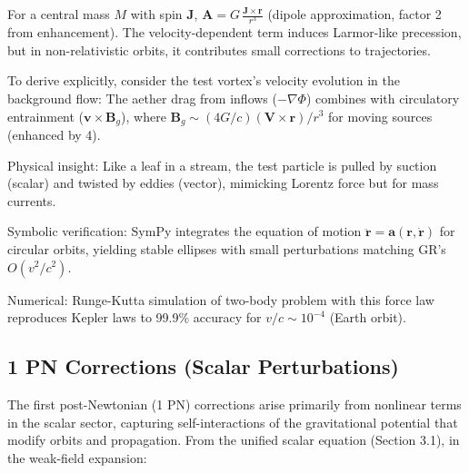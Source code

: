 For a central mass $M$ with spin $\mathbf{J}$, $\mathbf{A} = G \, \frac{\mathbf{J} \times \mathbf{r}}{r^3}$ (dipole approximation, factor 2 from enhancement). The velocity-dependent term induces Larmor-like precession, but in non-relativistic orbits, it contributes small corrections to trajectories.

To derive explicitly, consider the test vortex's velocity evolution in the background flow: The aether drag from inflows ($-\nabla \Phi$) combines with circulatory entrainment ($\mathbf{v} \times \mathbf{B}_g$), where $\mathbf{B}_g \sim (4 G / c) (\mathbf{V} \times \mathbf{r}) / r^3$ for moving sources (enhanced by 4).

Physical insight: Like a leaf in a stream, the test particle is pulled by suction (scalar) and twisted by eddies (vector), mimicking Lorentz force but for mass currents.

Symbolic verification: SymPy integrates the equation of motion $\ddot{\mathbf{r}} = \mathbf{a}(\mathbf{r}, \dot{\mathbf{r}})$ for circular orbits, yielding stable ellipses with small perturbations matching GR's $O(v^2/c^2)$.

Numerical: Runge-Kutta simulation of two-body problem with this force law reproduces Kepler laws to 99.9\% accuracy for $v/c \sim 10^{-4}$ (Earth orbit).

\medskip
\noindent
{}
\medskip

\subsection{1 PN Corrections (Scalar Perturbations)}

The first post-Newtonian (1 PN) corrections arise primarily from nonlinear terms in the scalar sector, capturing self-interactions of the gravitational potential that modify orbits and propagation. From the unified scalar equation (Section 3.1), in the weak-field expansion:

